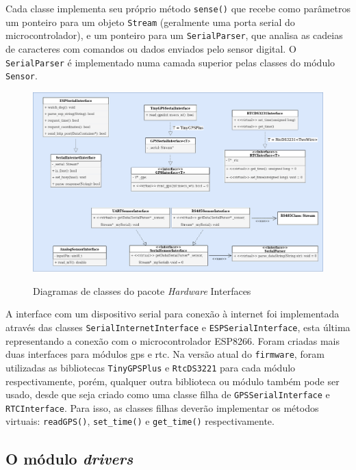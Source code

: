 Cada classe implementa seu próprio método \texttt{sense()} que recebe como parâmetros um ponteiro para um objeto \texttt{Stream} (geralmente uma porta serial do microcontrolador), e um ponteiro para um \texttt{SerialParser}, que analisa as cadeias de caracteres com comandos ou dados enviados pelo sensor digital. O \texttt{SerialParser} é implementado numa camada superior pelas classes do módulo \texttt{Sensor}.

\begin{figure}[h]
    \centering
    \caption{Diagramas de classes do pacote \textit{Hardware} Interfaces}
    \includegraphics[width=0.90\linewidth]{chapters//2-CLEAN/Figuras/Diagrama-de-classes-Hardware-Interfaces.png}
    \label{fig:fw-libraries-hw-interfaces}
\end{figure}

A interface com um dispositivo serial para conexão à internet foi implementada através das classes \texttt{SerialInternetInterface} e \texttt{ESPSerialInterface}, esta última representando a conexão com o microcontrolador ESP8266. Foram criadas mais duas interfaces para módulos \acrshort{gps} e \acrshort{rtc}. Na versão atual do \texttt{firmware}, foram utilizadas as bibliotecas \texttt{TinyGPSPlus} e \texttt{RtcDS3221} para cada módulo respectivamente, porém, qualquer outra biblioteca ou módulo também pode ser usado, desde que seja criado como uma classe filha de \texttt{GPSSerialInterface} e \texttt{RTCInterface}. Para isso, as classes filhas deverão implementar os métodos virtuais: \texttt{readGPS()}, \texttt{set\_time()} e \texttt{get\_time()} respectivamente.

\subsection{O módulo \textit{drivers}}

